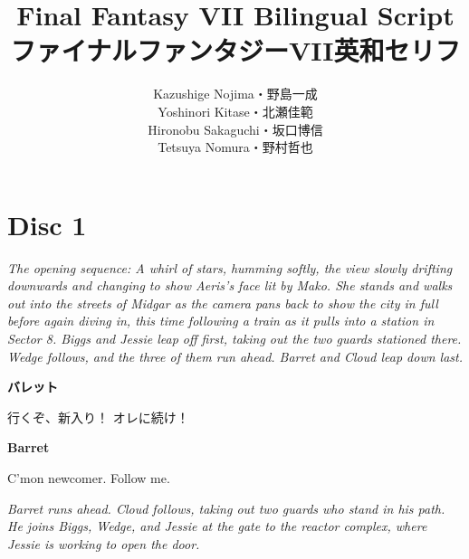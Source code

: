 \documentclass[10pt]{book}
\title{Final Fantasy VII Bilingual Script\\ファイナルファンタジーVII英和セリフ}
\author{Kazushige Nojima・野島一成\\Yoshinori Kitase・北瀬佳範\\Hironobu Sakaguchi・坂口博信\\Tetsuya Nomura・野村哲也}
\newcommand{\switchenglish}{\selectlanguage{english} \switchcolumn}
\newcommand{\role}[1]{\textbf{#1}}
\newcommand{\roleBarretEng}{\role{Barret}}
\newcommand{\roleBarretJap}{\role{バレット}}
\newcommand{\stageDirection}[1]{\textit{#1}}
\newenvironment{paracolSection}
    {\begin{paracol}{2}
    \selectlanguage{japanese}
    }
    {
    \end{paracol}
    }
\begin{document}
\maketitle

\section*{Disc 1}

\stageDirection{The opening sequence: A whirl of stars, humming softly, the view slowly
drifting downwards and changing to show Aeris's face lit by Mako. She stands
and walks out into the streets of Midgar as the camera pans back to show the
city in full before again diving in, this time following a train as it pulls
into a station in Sector 8. Biggs and Jessie leap off first, taking out the two
guards stationed there. Wedge follows, and the three of them run ahead. Barret
and Cloud leap down last.}

\begin{paracolSection}

\roleBarretJap

行くぞ、新入り！ オレに続け！

\switchenglish

\roleBarretEng

C'mon newcomer. Follow me.

\end{paracolSection}

\stageDirection{Barret runs ahead. Cloud follows, taking out two guards who stand in his path.
He joins Biggs, Wedge, and Jessie at the gate to the reactor complex, where
Jessie is working to open the door.}
\end{document}
